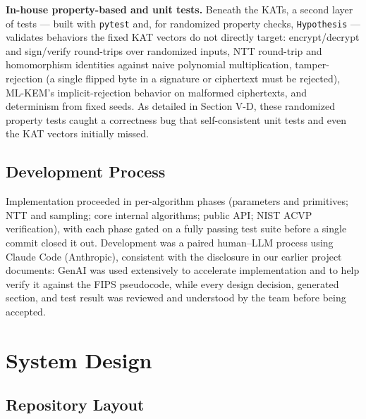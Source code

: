 \documentclass[10pt,conference]{IEEEtran}
\begin{document}
\textbf{In-house property-based and unit tests.} Beneath the KATs, a
second layer of tests --- built with \texttt{pytest} and, for randomized
property checks, \texttt{Hypothesis} --- validates behaviors the fixed
KAT vectors do not directly target: encrypt/decrypt and sign/verify
round-trips over randomized inputs, NTT round-trip and homomorphism
identities against naive polynomial multiplication, tamper-rejection
(a single flipped byte in a signature or ciphertext must be rejected),
ML-KEM's implicit-rejection behavior on malformed ciphertexts, and
determinism from fixed seeds. As detailed in Section V-D, these
randomized property tests caught a correctness bug that self-consistent
unit tests and even the KAT vectors initially missed.

\subsection{Development Process}

Implementation proceeded in per-algorithm phases (parameters and
primitives; NTT and sampling; core internal algorithms; public API; NIST
ACVP verification), with each phase gated on a fully passing test suite
before a single commit closed it out. Development was a paired
human--LLM process using Claude Code (Anthropic), consistent with the
disclosure in our earlier project documents: GenAI was used extensively
to accelerate implementation and to help verify it against the FIPS
pseudocode, while every design decision, generated section, and test
result was reviewed and understood by the team before being accepted.

\section{System Design}

\subsection{Repository Layout}
\end{document}
